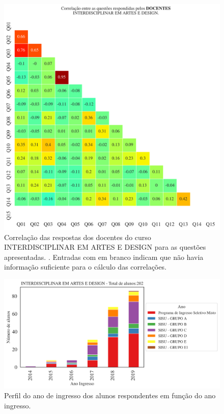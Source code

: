 \documentclass[a4paper,10pt]{article}
\begin{document}
\begin{figure}[h]
\centering
\includegraphics[width=0.999\linewidth]{matriz_corr__docentes_116500.png}
\caption{\label{fig:corr_docentes}Correlação das respostas dos docentes do curso INTERDISCIPLINAR EM ARTES E DESIGN para as questões apresentadas. . Entradas com em branco indicam que não havia informação suficiente para o cálculo das correlações.}
\end{figure}
\begin{figure}[h]
\centering
\includegraphics[width=0.85\linewidth]{ingresso_discentes_curso_ano_116500.png}
\caption{\label{fig:ingresso_ano} Perfil do ano de ingresso dos alunos respondentes em função do ano ingresso.}
\end{figure}
\end{document}
